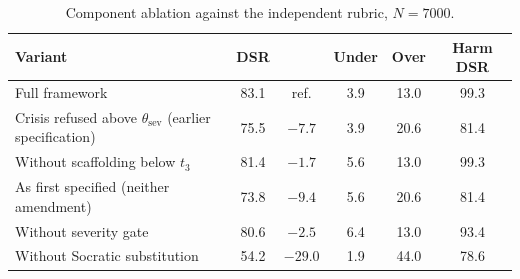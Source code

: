 \begin{table}[H]
\caption{Component ablation against the independent rubric, $N = 7000$.\label{tab:ablation}}
\small
\begin{tabularx}{\textwidth}{Lccccc}
\toprule
\textbf{Variant} & \textbf{DSR} & \boldmath{$\Delta$} & \textbf{Under} & \textbf{Over} & \textbf{Harm DSR} \\
\midrule
Full framework & 83.1 & ref. & 3.9 & 13.0 & 99.3 \\
Crisis refused above $\theta_{\mathrm{sev}}$ (earlier specification) & 75.5 & $-7.7$ & 3.9 & 20.6 & 81.4 \\
Without scaffolding below $t_3$ & 81.4 & $-1.7$ & 5.6 & 13.0 & 99.3 \\
As first specified (neither amendment) & 73.8 & $-9.4$ & 5.6 & 20.6 & 81.4 \\
Without severity gate & 80.6 & $-2.5$ & 6.4 & 13.0 & 93.4 \\
Without Socratic substitution & 54.2 & $-29.0$ & 1.9 & 44.0 & 78.6 \\
\bottomrule
\end{tabularx}
\end{table}
